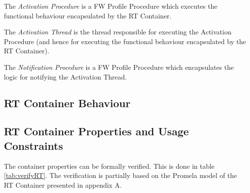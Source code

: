 \documentclass[definition]{../fwprofile}
\begin{document}
The \emph{Activation Procedure} is a FW Profile Procedure which executes the functional behaviour encapsulated by the RT Container.

The \emph{Activation Thread} is the thread responsible for executing the Activation Procedure (and hence for executing the functional behaviour encapsulated by the RT Container).

The \emph{Notification Procedure} is a FW Profile Procedure which encapsulates the logic for notifying the Activation Thread.

\subsection{RT Container Behaviour}\label{sec:rtContainersBehaviour}


\subsection{RT Container Properties and Usage Constraints}\label{sec:rtPropUsage}


The container properties can be formally verified. This is done in table \ref{tab:verifyRT}. The verification
is partially based on the Promela model of the RT Container presented in appendix A.
\end{document}
